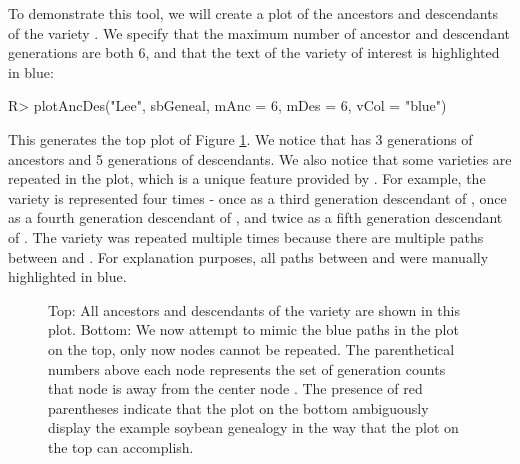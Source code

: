 \documentclass[article,shortnames]{jss}
\begin{document}
To demonstrate this tool, we will create a plot of the ancestors and descendants of the variety . We specify that the maximum number of ancestor and descendant generations are both 6, and that the text of the variety of interest is highlighted in blue:

\begin{Code}
R> plotAncDes("Lee", sbGeneal, mAnc = 6, mDes = 6, vCol = "blue")
\end{Code}

This generates the top plot of Figure \ref{fig:Lee}. We notice that  has 3 generations of ancestors and 5 generations of descendants. We also notice that some varieties are repeated in the plot, which is a unique feature provided by . For example, the variety  is represented four times - once as a third generation descendant of , once as a fourth generation descendant of , and twice as a fifth generation descendant of . The variety  was repeated multiple times because there are multiple paths between  and . For explanation purposes, all paths between  and  were manually highlighted in blue.

\begin{figure}[H]
    \centering
    \caption{Top: All ancestors and descendants of the variety  are shown in this  plot. Bottom: We now attempt to mimic the blue paths in the  plot on the top, only now nodes cannot be repeated. The parenthetical numbers above each node represents the set of generation counts that node is away from the center node . The presence of red parentheses indicate that the plot on the bottom ambiguously display the example soybean genealogy in the way that the  plot on the top can accomplish.}
    \label{fig:Lee}
\end{figure}
\end{document}
